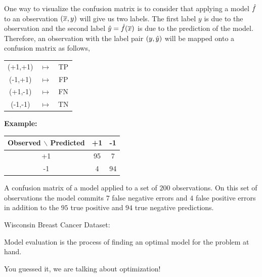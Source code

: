 \documentclass[a4paper,blends,pdf,colorBG,slideColor]{prosper}
\begin{document}
One way to visualize the confusion matrix is to consider that applying a model $\hat{f}$ to an observation $(\overline{x},y)$ will 
give us two labels.  The first label $y$ is  due to the observation and the second label
$\hat{y} = \hat{f}(\overline{x})$ is due to the prediction of the model.
Therefore, an observation with the label pair $(y,\hat{y})$ will be mapped onto 
a confusion matrix as follows,
\begin{center}
\begin{tabular}{ccc}
(+1,+1) & $\mapsto$ & TP\\
(-1,+1) & $\mapsto$ & FP\\
(+1,-1) & $\mapsto$ & FN\\
(-1,-1) & $\mapsto$ & TN
\end{tabular}
\end{center}

\es

{\bf Example:}
\begin{center}
\scriptsize
   \begin{tabular}{ccc}
      \toprule
  Observed $\backslash$  Predicted & +1 & -1 \\
      \midrule
      +1      & 95 & 7  \\
      -1 & 4 & 94\\
      \bottomrule
   \end{tabular}
\end{center}
A confusion matrix of a model applied to 
a set of $200$ observations.  On this set of observations the model commits $7$ false negative errors
and $4$ false positive errors in addition to the $95$ true positive and $94$ true negative
predictions.  
\es

Wisconsin Breast Cancer Dataset:

\es

Model evaluation is the process of finding an optimal model for the problem at hand.

You guessed it, we are talking about optimization!
\end{document}
